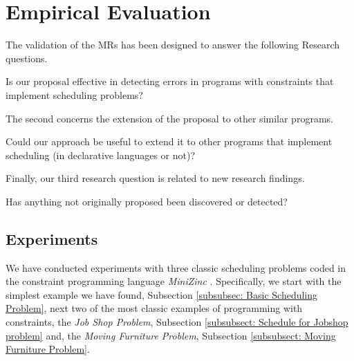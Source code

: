 \section{Empirical Evaluation}
\label{sec:Empirical Evaluation}

 The validation of the MRs has been
designed to answer the following Research questions.

\begin{ResearchQuestion}
\label{ResearchQuestion_1}
Is our proposal effective in detecting errors in programs with constraints that implement scheduling problems?
\end{ResearchQuestion}

The second concerns the extension of the proposal to other similar programs.

\begin{ResearchQuestion}
\label{ResearchQuestion_2}
Could our approach be useful to extend it to other programs that implement scheduling (in declarative languages or not)?
\end{ResearchQuestion}

Finally, our third research question is related to new research findings.

\begin{ResearchQuestion}
\label{ResearchQuestion_3}
Has anything not originally proposed been discovered or detected?
\end{ResearchQuestion}

\subsection{Experiments}

We have conducted experiments with three classic scheduling problems coded in the constraint programming language \textit{MiniZinc} \cite{nethercote2007minizinc,marriott2014minizinc}.
Specifically, we start with the simplest example we have found,
Subsection \ref{subsubsec: Basic Scheduling Problem}, next two of the
most classic examples of programming with constraints, the \textit{Job
  Shop Problem}, Subsection \ref{subsubsect: Schedule for Jobshop
  problem}  \cite{xiong2022survey,fernandes2022energy} and, the
\textit{Moving Furniture Problem}, Subsection \ref{subsubsect: Moving
  Furniture Problem}.


